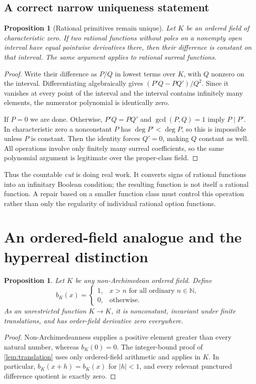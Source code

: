 \documentclass[11pt,letterpaper]{article}
\numberwithin{equation}{section}
\newtheorem{proposition}[theorem]{Proposition}
\theoremstyle{definition}
\theoremstyle{remark}
\newcommand{\N}{\mathbb{N}}
\begin{document}
\subsection{A correct narrow uniqueness statement}
\begin{proposition}[Rational primitives remain unique]\label{prop:rational}
Let $K$ be an ordered field of characteristic zero. If two rational
functions without poles on a nonempty open interval have equal pointwise
derivatives there, then their difference is constant on that interval.
The same argument applies to rational surreal functions.
\end{proposition}
\begin{proof}
Write their difference as $P/Q$ in lowest terms over $K$, with $Q$ nonzero
on the interval. Differentiating algebraically gives
$(P'Q-PQ')/Q^2$. Since it vanishes at every point of the interval and the
interval contains infinitely many elements, the numerator polynomial is
identically zero.

If $P=0$ we are done. Otherwise, $P'Q=PQ'$ and $\gcd(P,Q)=1$ imply
$P\mid P'$. In characteristic zero a nonconstant $P$ has
$\deg P'<\deg P$, so this is impossible unless $P$ is constant.
Then the identity forces $Q'=0$, making $Q$ constant as well.
All operations involve only finitely many surreal coefficients, so the
same polynomial argument is legitimate over the proper-class field.
\end{proof}

Thus the countable \emph{cut} is doing real work. It converts signs of
rational functions into an infinitary Boolean condition; the resulting
function is not itself a rational function. A repair based on a smaller
function class must control this operation rather than only the
regularity of individual rational option functions.

\section{An ordered-field analogue and the hyperreal distinction}\label{sec:hyperreal}
\begin{proposition}\label{prop:field}
Let $K$ be any non-Archimedean ordered field. Define
\[
 b_K(x)=\begin{cases}
 1,&x>n\text{ for all ordinary }n\in\N,\\
 0,&\text{otherwise}.
 \end{cases}
\]
As an unrestricted function $K\to K$, it is nonconstant, invariant under
finite translations, and has order-field derivative zero everywhere.
\end{proposition}
\begin{proof}
Non-Archimedeanness supplies a positive element greater than every natural
number, whereas $b_K(0)=0$. The integer-bound proof of
\cref{lem:translation} uses only ordered-field arithmetic and applies in
$K$. In particular, $b_K(x+h)=b_K(x)$ for $|h|<1$, and every relevant
punctured difference quotient is exactly zero.
\end{proof}
\end{document}
